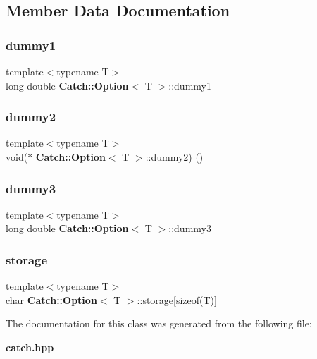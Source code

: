 \subsection{Member Data Documentation}
\mbox{\label{class_catch_1_1_option_a48ef08179923d6f943abe614999e6073}} 
\subsubsection{dummy1}
{\footnotesize\ttfamily template$<$typename T$>$ \\
long double \textbf{ Catch\+::\+Option}$<$ T $>$\+::dummy1}

\mbox{\label{class_catch_1_1_option_afa73c2396b7732932a148b3c889b81d1}} 
\subsubsection{dummy2}
{\footnotesize\ttfamily template$<$typename T$>$ \\
void($\ast$ \textbf{ Catch\+::\+Option}$<$ T $>$\+::dummy2) ()}

\mbox{\label{class_catch_1_1_option_a5540a84662093591be496c3a57e9da3f}} 
\subsubsection{dummy3}
{\footnotesize\ttfamily template$<$typename T$>$ \\
long double \textbf{ Catch\+::\+Option}$<$ T $>$\+::dummy3}

\mbox{\label{class_catch_1_1_option_acdebca1b18bb8542c3f676b8dd805f23}} 
\subsubsection{storage}
{\footnotesize\ttfamily template$<$typename T$>$ \\
char \textbf{ Catch\+::\+Option}$<$ T $>$\+::storage[sizeof(T)]}



The documentation for this class was generated from the following file\+:\begin{DoxyCompactItemize}
\item 
\textbf{ catch.\+hpp}\end{DoxyCompactItemize}
